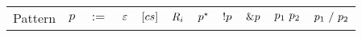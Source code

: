 \begin{tabular}{llll|l|l|l|l|l|l|l}
    Pattern & $p$ & $:=$
    & $\varepsilon$
    & $[cs]$
    & $R_{i}$
    & $p^\star$
    & $!p$
    & $\&p$
    & $p_1\ p_2$
    & $p_1\ /\ p_2$
\end{tabular}